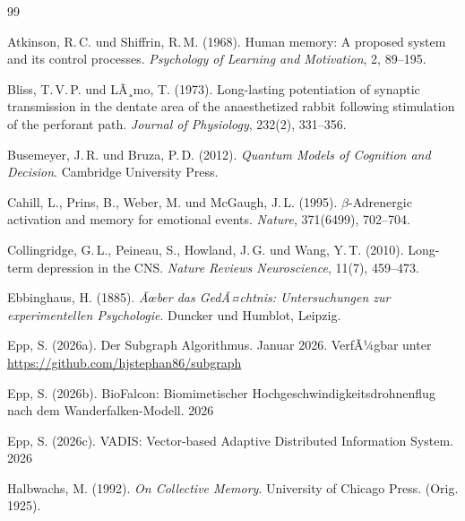 ﻿\documentclass[12pt,a4paper,twoside]{article}
\theoremstyle{theormstyle}
\theoremstyle{proofstyle}
\begin{document}
	\begin{thebibliography}{99}
		
		Atkinson, R.\,C. und Shiffrin, R.\,M. (1968).
		Human memory: A proposed system and its control processes.
		\textit{Psychology of Learning and Motivation}, 2, 89--195.
		
		Bliss, T.\,V.\,P. und LÃ¸mo, T. (1973).
		Long-lasting potentiation of synaptic transmission in the
		dentate area of the anaesthetized rabbit following stimulation
		of the perforant path.
		\textit{Journal of Physiology}, 232(2), 331--356.
		
		Busemeyer, J.\,R. und Bruza, P.\,D. (2012).
		\textit{Quantum Models of Cognition and Decision}.
		Cambridge University Press.
		
		Cahill, L., Prins, B., Weber, M. und McGaugh, J.\,L. (1995).
		$\beta$-Adrenergic activation and memory for emotional events.
		\textit{Nature}, 371(6499), 702--704.
		
		Collingridge, G.\,L., Peineau, S., Howland, J.\,G. und Wang, Y.\,T. (2010).
		Long-term depression in the CNS.
		\textit{Nature Reviews Neuroscience}, 11(7), 459--473.
		
		Ebbinghaus, H. (1885).
		\textit{Ãœber das GedÃ¤chtnis: Untersuchungen zur experimentellen Psychologie}.
		Duncker und Humblot, Leipzig.
		
		Epp, S. (2026a).
		Der Subgraph Algorithmus. Januar 2026. VerfÃ¼gbar unter \url{https://github.com/hjstephan86/subgraph}
		
		Epp, S. (2026b).
		BioFalcon: Biomimetischer Hochgeschwindigkeitsdrohnenflug nach
		dem Wanderfalken-Modell. 2026
		
		Epp, S. (2026c).
		VADIS: Vector-based Adaptive Distributed Information System. 2026
		
		Halbwachs, M. (1992).
		\textit{On Collective Memory}.
		University of Chicago Press. (Orig. 1925).
		

\end{thebibliography}
\end{document}
